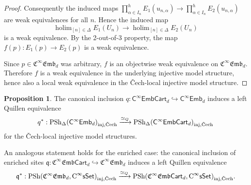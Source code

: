 \documentclass{amsart}
\newcommand{\cat}[1]{\mathsf{#1}}
\newcommand{\sset}{\cat{sSet}}
\newcommand{\we}{\simeq}
\DeclareMathOperator*{\holim}{holim}
\newcommand{\inj}{\textnormal{inj}}
\newcommand{\Cech}{\textnormal{\v{C}ech}}
\newcommand{\CsSet}{\textnormal{C}^{\infty}\sset}
\newcommand{\fembnoniso}[1]{\cat{C}^{\infty}\cat{Emb}_{#1}}
\newcommand{\fembcartnoniso}[1]{\cat{C}^{\infty}\cat{EmbCart}_{#1}}
\newcommand{\femb}[1]{\mathfrak{C}^{\infty}\mathfrak{Emb}_{#1}}
\newcommand{\fembcart}[1]{\mathfrak{C}^{\infty}\mathfrak{Emb}\cat{Cart}_{#1}}
\newcommand{\psh}{\mathrm{PSh}}
\newcommand{\spsh}{\mathrm{PSh}_{\Delta}}
\theoremstyle{definition}
\newtheorem{proposition}[equation]{Proposition}
\numberwithin{equation}{subsection}
\numberwithin{subsubsection}{subsection}
\begin{document}
\begin{proof}
  Consequently the induced maps \(\prod\nolimits^{h}_{\alpha\in
  I_n}E_1(u_{n,\alpha})\to \prod\nolimits^{h}_{\alpha\in I_n}E_2(u_{n,\alpha})\)
  are weak
  equivalences for all \(n\).
  Hence the induced
  map
  \[
    \holim_{[n]\in\Delta}E_{1}(U_{n})
    \longrightarrow
    \holim_{[n]\in\Delta}E_{2}(U_{n})
  \]
  is a weak equivalence. By the 2-out-of-3 property, the map
  \(f(p):E_{1}(p)\to E_{2}(p)\) is a weak equivalence.

  Since \(p\in\femb{d}\) was arbitrary, \(f\) is an objectwise weak equivalence
  on
  \(\femb{d}\). Therefore \(f\) is a weak equivalence in the underlying
  injective model structure, hence also a local weak equivalence in the
  \v{C}ech-local injective model structure.
\end{proof}

\begin{proposition}\label{prop:infty.dense.inclusion.of.sites}
  The canonical inclusion
  \(q:\fembcartnoniso{d}\hookrightarrow\fembnoniso{d}\) induces a left
  Quillen equivalence
  \[
    q^{*}:
    \spsh(\fembnoniso{d})_{\inj,\Cech}
    \xrightarrow{\we_{Q}}
    \spsh(\fembcartnoniso{d})_{\inj,\Cech}
  \]
  for the \v{C}ech-local injective model structures.

  An analogous statement holds for the enriched case: the
  canonical inclusion of enriched sites
  \(\mathfrak{q}:\fembcart{d}\hookrightarrow\femb{d}\) induces a left
  Quillen equivalence
  \[
    \mathfrak{q}^{*}:
    \psh(\femb{d},\CsSet)_{\inj,\Cech}
    \xrightarrow{\we_{Q}}
    \psh(\fembcart{d},\CsSet)_{\inj,\Cech}.
  \]
\end{proposition}
\end{document}
